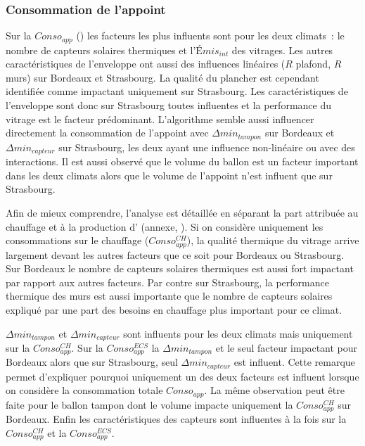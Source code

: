 \subsubsection{Consommation de l’appoint} %
\label{ssub:consommation_de_l_appoint}
Sur la $Conso_{app}$ () les facteurs les plus influents sont
pour les deux climats~: le nombre de capteurs solaires thermiques et l’$Émis_{int}$ des
vitrages. Les autres caractéristiques de l’enveloppe ont aussi des influences linéaires
($R$ plafond, $R$ murs) sur Bordeaux et Strasbourg. La qualité du plancher est cependant
identifiée comme impactant uniquement sur Strasbourg. Les caractéristiques de l’enveloppe
sont donc sur Strasbourg toutes influentes et la performance du vitrage est le facteur
prédominant.
L’algorithme semble aussi influencer directement la consommation de l’appoint avec
$\Delta min_{tampon}$ sur Bordeaux et $\Delta min_{capteur}$ sur Strasbourg, les deux
ayant une influence non-linéaire ou avec des interactions. Il est aussi observé que
le volume du ballon  est un facteur important dans les deux climats alors
que le volume de l’appoint n’est influent que sur Strasbourg.

Afin de mieux comprendre, l’analyse est détaillée en séparant la part attribuée au
chauffage et à la production d’ (annexe, ).
Si on considère uniquement les consommations sur le chauffage ($Conso_{app}^{CH}$),
la qualité thermique du vitrage arrive largement devant les autres facteurs que ce
soit pour Bordeaux ou Strasbourg. Sur Bordeaux le nombre de capteurs solaires
thermiques est aussi fort impactant par rapport aux autres facteurs. Par contre
sur Strasbourg, la performance thermique des murs est aussi importante que le nombre
de capteurs solaires expliqué par une part des besoins en chauffage plus important
pour ce climat.

$\Delta min_{tampon}$ et $\Delta min_{capteur}$ sont influents pour les deux climats
mais uniquement sur la $Conso_{app}^{CH}$. Sur la $Conso_{app}^{ECS}$ la $\Delta min_{tampon}$ et le seul
facteur impactant pour Bordeaux alors que sur Strasbourg, seul $\Delta min_{capteur}$ est influent.
Cette remarque permet d’expliquer pourquoi uniquement un des deux facteurs est influent lorsque
on considère la consommation totale $Conso_{app}$. La même observation peut être faite
pour le ballon tampon dont le volume impacte uniquement la $Conso_{app}^{CH}$ sur Bordeaux.
Enfin les caractéristiques des capteurs sont influentes à la fois sur la
$Conso_{app}^{CH}$ et la $Conso_{app}^{ECS}$.

